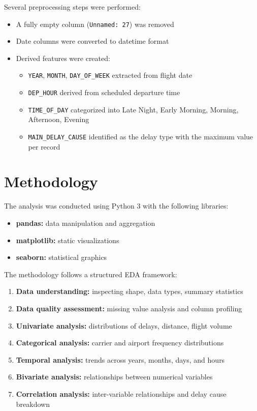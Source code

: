 \documentclass[12pt,a4paper]{article}
\begin{document}
Several preprocessing steps were performed:
\begin{itemize}
    \item A fully empty column (\texttt{Unnamed: 27}) was removed
    \item Date columns were converted to datetime format
    \item Derived features were created:
    \begin{itemize}
        \item \texttt{YEAR}, \texttt{MONTH}, \texttt{DAY\_OF\_WEEK} extracted from flight date
        \item \texttt{DEP\_HOUR} derived from scheduled departure time
        \item \texttt{TIME\_OF\_DAY} categorized into Late Night, Early Morning, Morning, Afternoon, Evening
        \item \texttt{MAIN\_DELAY\_CAUSE} identified as the delay type with the maximum value per record
    \end{itemize}
\end{itemize}

\section{Methodology}

The analysis was conducted using Python 3 with the following libraries:
\begin{itemize}
    \item \textbf{pandas:} data manipulation and aggregation
    \item \textbf{matplotlib:} static visualizations
    \item \textbf{seaborn:} statistical graphics
\end{itemize}

The methodology follows a structured EDA framework:
\begin{enumerate}
    \item \textbf{Data understanding:} inspecting shape, data types, summary statistics
    \item \textbf{Data quality assessment:} missing value analysis and column profiling
    \item \textbf{Univariate analysis:} distributions of delays, distance, flight volume
    \item \textbf{Categorical analysis:} carrier and airport frequency distributions
    \item \textbf{Temporal analysis:} trends across years, months, days, and hours
    \item \textbf{Bivariate analysis:} relationships between numerical variables
    \item \textbf{Correlation analysis:} inter-variable relationships and delay cause breakdown
\end{enumerate}
\end{document}
